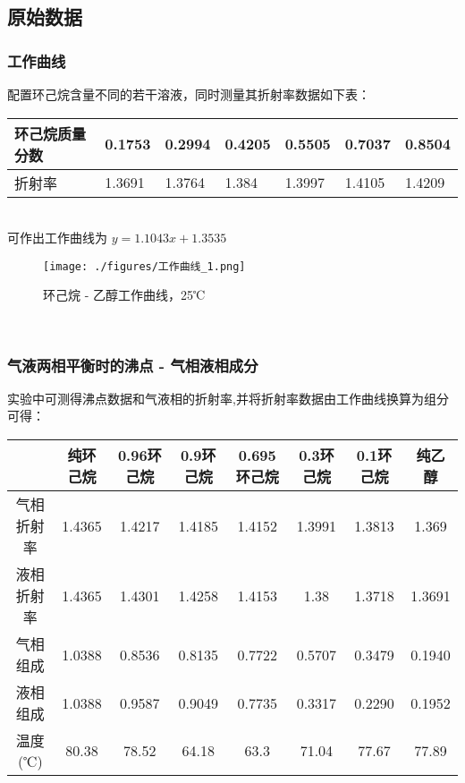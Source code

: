 \documentclass[4pt,a4papper]{article}
\begin{document}
\subsection{原始数据}
\subsubsection{工作曲线}

配置环己烷含量不同的若干溶液，同时测量其折射率数据如下表：
\begin{table}[h]
\begin{tabular}{|l|l|l|l|l|l|l|}
\hline
环己烷质量分数 & 0.1753 & 0.2994 & 0.4205 & 0.5505 & 0.7037 & 0.8504 \\ \hline
折射率     & 1.3691 & 1.3764 & 1.384  & 1.3997 & 1.4105 & 1.4209 \\ \hline
\end{tabular}
\end{table}
~\\

可作出工作曲线为 $y = 1.1043 x + 1.3535$
    \begin{figure}[htb]
        \centering
        \texttt{[image: ./figures/工作曲线\_1.png]}
        \caption{环己烷 - 乙醇工作曲线，25℃} \label{fig: 2}
    \end{figure}
~\\

\subsubsection{气液两相平衡时的沸点 - 气相液相成分}
实验中可测得沸点数据和气液相的折射率,并将折射率数据由工作曲线换算为组分可得：
\begin{table}[htbp]
\begin{tabular}{|c|c|c|c|c|c|c|c|}
\hline
      & 纯环己烷   & 0.96环己烷 & 0.9环己烷 & 0.695环己烷 & 0.3环己烷 & 0.1环己烷 & 纯乙醇    \\ \hline
气相折射率 & 1.4365 & 1.4217  & 1.4185 & 1.4152   & 1.3991 & 1.3813 & 1.369  \\ \hline
液相折射率 & 1.4365 & 1.4301  & 1.4258 & 1.4153   & 1.38   & 1.3718 & 1.3691 \\ \hline
气相组成& 1.0388 & 0.8536 & 0.8135 & 0.7722 & 0.5707 & 0.3479 & 0.1940 \\ \hline
液相组成& 1.0388 & 0.9587 & 0.9049 & 0.7735 & 0.3317 & 0.2290 & 0.1952 \\ \hline
温度(℃) & 80.38  & 78.52   & 64.18  & 63.3     & 71.04  & 77.67  & 77.89  \\ \hline
\end{tabular}
\end{table}
\end{document}
